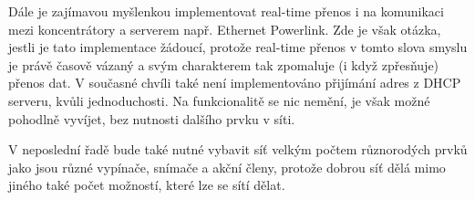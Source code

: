 
Dále je zajímavou myšlenkou implementovat real-time přenos i na komunikaci mezi koncentrátory a serverem např. Ethernet Powerlink. Zde je však otázka, jestli je tato implementace žádoucí, protože real-time přenos v tomto slova smyslu je právě časově vázaný a svým charakterem tak zpomaluje (i když zpřesňuje) přenos dat. V současné chvíli také není implementováno přijímání adres z DHCP serveru, kvůli jednoduchosti. Na funkcionalitě se nic nemění, je však možné pohodlně vyvíjet, bez nutnosti dalšího prvku v síti.

V neposlední řadě bude také nutné vybavit síť velkým počtem růz\-no\-ro\-dých prvků jako jsou různé vypínače, snímače a akční členy, protože dobrou síť dělá mimo jiného také počet možností, které lze se sítí dělat.